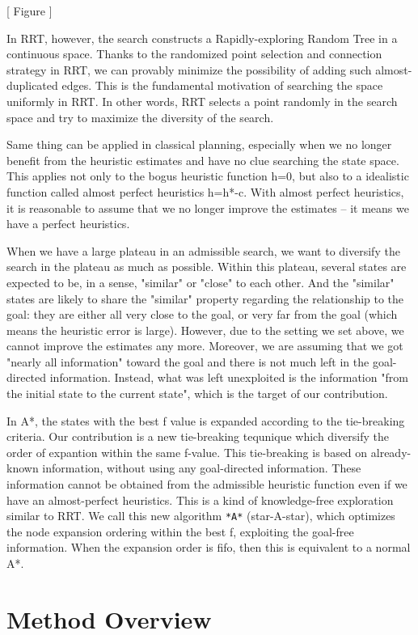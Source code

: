 [ Figure ]

In RRT, however, the search constructs a Rapidly-exploring Random Tree in a continuous space.
Thanks to the randomized point selection and connection strategy in RRT,
we can provably minimize the possibility of adding such almost-duplicated edges.
This is the fundamental motivation of searching the space uniformly in RRT.
In other words, RRT selects a point randomly in the search space and
try to maximize the diversity of the search.

Same thing can be applied in classical planning, especially when we no
longer benefit from the heuristic estimates and have no clue searching the
state space.
This applies not only to the bogus heuristic function h=0, but also to a idealistic
function called almost perfect heuristics h=h*-c. With almost perfect
heuristics, it is reasonable to assume that we no longer improve the
estimates -- it means we have a perfect heuristics.

When we have a large plateau in an admissible search,
we want to diversify the search in the plateau as much as possible.
Within this plateau, several states are expected to be, in a sense,
"similar" or "close" to each other. And the "similar" states are likely to
share the "similar" property regarding the relationship to the goal:
they are either all very close to the goal, or very far from the goal (which means
the heuristic error is large). However, due to the setting we set
above, we cannot improve the estimates any more. Moreover, we are assuming
that we got "nearly all information" toward the goal and there is not much
left in the goal-directed information.
Instead, what was left unexploited is the information "from the initial state to the
current state", which is the target of our contribution.

In A*, the states with the best f value is expanded according to the
tie-breaking criteria. Our contribution is a new tie-breaking tequnique
which diversify the order of expantion within the same f-value.
This tie-breaking is based on already-known information,
without using any goal-directed information.
These information cannot be obtained from the admissible heuristic function even if we
have an almost-perfect heuristics.
This is a kind of knowledge-free exploration similar to RRT.
We call this new algorithm \texttt{*A*} (star-A-star), which optimizes the node
expansion ordering within the best f, exploiting the goal-free information.
When the expansion order is fifo, then this is equivalent to a normal A*.
\section{Method Overview}
\label{sec-2}

